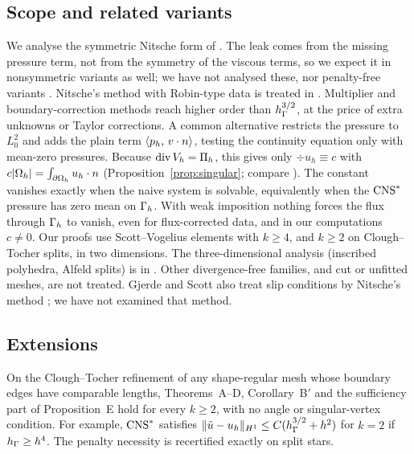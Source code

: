 \subsection*{Scope and related variants}
We analyse the symmetric Nitsche form of \cite{GjerdeScott2024}. The leak comes from the missing pressure term, not from the symmetry of the viscous terms, so we expect it in nonsymmetric variants as well; we have not analysed these, nor penalty-free variants \cite{FreundStenberg1995,Burman2012,BoiveauBurman2016}. Nitsche's method with Robin-type data is treated in \cite{JuntunenStenberg2009}. Multiplier and boundary-correction methods \cite{LiuNeilanOtus2023,BurmanHansboLarson2024,BrambleDupontThomee1972,DupontGuzmanScott2025} reach higher order than $h_\Gamma^{3/2}$, at the price of extra unknowns or Taylor corrections.
A common alternative restricts the pressure to $L^2_0$ and adds the plain term $\langle p_h,\, v\cdot n\rangle$, testing the continuity equation only with mean-zero pressures. Because $\operatorname{div}V_h=\Pi_h$, this gives only $\div u_h\equiv c$ with $c|\Omega_h|=\int_{\partial\Omega_h}u_h\cdot n$ (Proposition~\ref{prop:singular}; compare \cite[(5.9)]{FrachonNilssonZahedi2024}). The constant vanishes exactly when the naive system is solvable, equivalently when the $\mathrm{CNS}^\ast$ pressure has zero mean on $\Gamma_h$. With weak imposition nothing forces the flux through $\Gamma_h$ to vanish, even for flux-corrected data, and in our computations $c\ne0$.
Our proofs use Scott--Vogelius elements with $k\ge4$, and $k\ge2$ on Clough--Tocher splits, in two dimensions. The three-dimensional analysis (inscribed polyhedra, Alfeld splits) is in \cite{PadhiThreeD}. Other divergence-free families, and cut or unfitted meshes, are not treated. Gjerde and Scott also treat slip conditions by Nitsche's method \cite{GjerdeScott2022}; we have not examined that method.

\subsection*{Extensions}
\begin{theoremF}
On the Clough--Tocher refinement of any shape-regular mesh whose boundary edges have comparable lengths, Theorems~A--D, Corollary~B$'$ and the sufficiency part of Proposition~E hold for every $k\ge2$, with no angle or singular-vertex condition. For example, $\mathrm{CNS}^\ast$ satisfies $\lVert \tilde u-u_h\rVert_{H^1}\le C(h_\Gamma^{3/2}+h^2)$ for $k=2$ if $h_\Gamma\ge h^4$. The penalty necessity is recertified exactly on split stars.
\end{theoremF}

